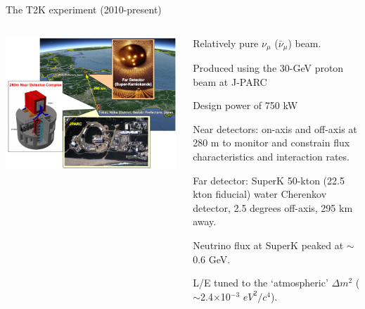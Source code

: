 \begin{frame}{The T2K experiment (2010-present)}
\begin{columns}
  \begin{column}{0.60\textwidth}
     \includegraphics[width=0.99\textwidth]{./images/3nu/accelerator/t2k_overview.png}
  \end{column}
  \begin{column}{0.40\textwidth}
  \begin{itemize}
  {\scriptsize
    \item Relatively pure $\nu_{\mu}$ ($\bar{\nu}_{\mu}$) beam.
    \item Produced using the 30-GeV proton beam at J-PARC
    \item Design power of 750 kW
    \item Near detectors: on-axis and off-axis at 280 m to monitor and constrain flux characteristics and interaction rates.
    \item Far detector: SuperK 50-kton (22.5 kton fiducial) water Cherenkov detector, 2.5 degrees off-axis, 295 km away.
    \item Neutrino flux at SuperK peaked at $\sim$0.6 GeV.
    \item L/E tuned to the `atmospheric' ${\Delta}m^{2}$ ($\sim$2.4$\times$10$^{-3}$ $eV^{2}/c^{4}$).
  }
  \end{itemize}
  \end{column}
\end{columns}
\end{frame}

